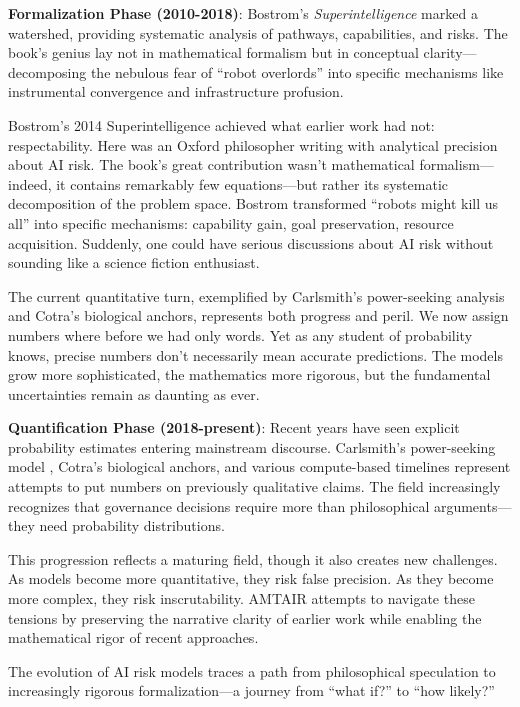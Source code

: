 \documentclass[
  11pt,
  letterpaper,
  openany]{book}
\begin{document}
\textbf{Formalization Phase (2010-2018)}: Bostrom's
\emph{Superintelligence} \textcite{bostrom2014} marked a watershed,
providing systematic analysis of pathways, capabilities, and risks. The
book's genius lay not in mathematical formalism but in conceptual
clarity---decomposing the nebulous fear of ``robot overlords'' into
specific mechanisms like instrumental convergence and infrastructure
profusion.

Bostrom's 2014 Superintelligence achieved what earlier work had not:
respectability. Here was an Oxford philosopher writing with analytical
precision about AI risk. The book's great contribution wasn't
mathematical formalism---indeed, it contains remarkably few
equations---but rather its systematic decomposition of the problem
space. Bostrom transformed ``robots might kill us all'' into specific
mechanisms: capability gain, goal preservation, resource acquisition.
Suddenly, one could have serious discussions about AI risk without
sounding like a science fiction enthusiast.

The current quantitative turn, exemplified by Carlsmith's power-seeking
analysis and Cotra's biological anchors, represents both progress and
peril. We now assign numbers where before we had only words. Yet as any
student of probability knows, precise numbers don't necessarily mean
accurate predictions. The models grow more sophisticated, the
mathematics more rigorous, but the fundamental uncertainties remain as
daunting as ever.

\textbf{Quantification Phase (2018-present)}: Recent years have seen
explicit probability estimates entering mainstream discourse.
Carlsmith's power-seeking model \textcite{carlsmith2022}, Cotra's
biological anchors, and various compute-based timelines represent
attempts to put numbers on previously qualitative claims. The field
increasingly recognizes that governance decisions require more than
philosophical arguments---they need probability distributions.

This progression reflects a maturing field, though it also creates new
challenges. As models become more quantitative, they risk false
precision. As they become more complex, they risk inscrutability. AMTAIR
attempts to navigate these tensions by preserving the narrative clarity
of earlier work while enabling the mathematical rigor of recent
approaches.

The evolution of AI risk models traces a path from philosophical
speculation to increasingly rigorous formalization---a journey from
``what if?'' to ``how likely?''
\end{document}
